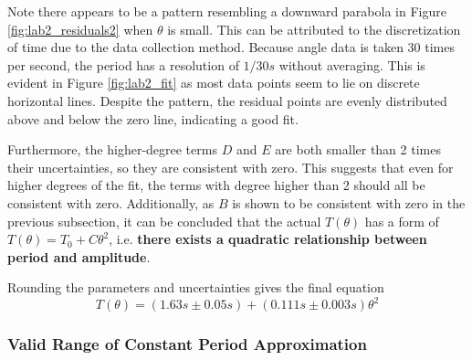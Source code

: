 \documentclass[aps,twocolumn,secnumarabic,nobalancelastpage,amsmath,amssymb,nofootinbib,floatfix,letterpaper]{revtex4}
\begin{document}
Note there appears to be a pattern resembling a downward parabola in Figure \ref{fig:lab2_residuals2} when \(\theta\) is
small. This can be attributed to the discretization of time due to the data collection method. Because angle data is
taken 30 times per second, the period has a resolution of \(1/30\si{s}\) without averaging. This is evident in Figure
\ref{fig:lab2_fit} as most data points seem to lie on discrete horizontal lines. Despite the pattern, the residual
points are evenly distributed above and below the zero line, indicating a good fit.

Furthermore, the higher-degree terms \(D\) and \(E\) are both smaller than 2 times their uncertainties, so they are
consistent with zero. This suggests that even for higher degrees of the fit, the terms with degree
higher than 2 should all be consistent with zero. Additionally, as \(B\) is shown to be consistent with zero in the
previous subsection, it can be concluded that the actual \(T(\theta)\) has a form of \(T(\theta) = T_0 + C\theta^2\),
i.e. \textbf{there exists a quadratic relationship between period and amplitude}.

Rounding the parameters and uncertainties gives the final equation
\begin{equation}
    T(\theta) = (1.63\si{s} \pm 0.05\si{s}) + (0.111\si{s} \pm 0.003\si{s})\theta^2
    \label{eqn:period_amplitude}
\end{equation}

\subsubsection{Valid Range of Constant Period Approximation}
\label{sec:lab2_range}
\end{document}
